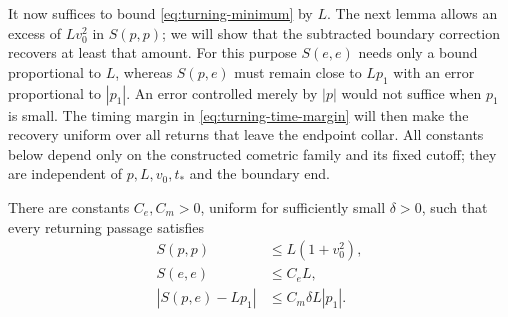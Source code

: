 It now suffices to bound \eqref{eq:turning-minimum} by $L$.
The next lemma allows an excess of $Lv_0^2$ in $S(p,p)$; we will show
that the subtracted boundary correction recovers at least that amount.
For this purpose $S(e,e)$ needs only a bound proportional to $L$,
whereas $S(p,e)$ must remain close to $Lp_1$ with an error proportional
to $|p_1|$.  An error controlled merely by $|p|$ would not suffice when
$p_1$ is small.  The timing margin in
\eqref{eq:turning-time-margin} will then make the recovery uniform over
all returns that leave the endpoint collar.  All constants below
depend only on the constructed cometric family and its fixed cutoff;
they are independent of $p,L,v_0,t_*$ and the boundary end.

\begin{lemma}\label{lem:turning-S-bounds}
There are constants $C_e,C_m>0$, uniform for sufficiently small
$\delta>0$, such that every returning passage satisfies
\begin{align}
 S(p,p)&\le L(1+v_0^2),\label{eq:turning-Spp}\\
 S(e,e)&\le C_e L,\label{eq:turning-See}\\
 |S(p,e)-Lp_1|&\le C_m\delta L|p_1|.\label{eq:turning-Spe}
\end{align}
\end{lemma}

